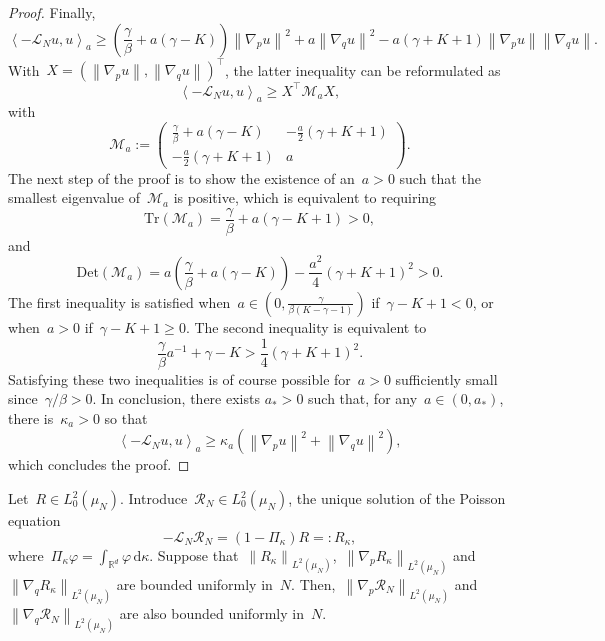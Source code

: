 \documentclass[onefignum,onetabnum]{siamart251216} %
\renewcommand{\d}{\mathrm{d}}
\newcommand{\norm}[1]{\left\lVert#1\right\rVert}
\newcommand{\real}{\mathbb R}
\newcommand{\mc}[1]{\mathcal{#1}}
\renewcommand{\geq}{\geqslant}
\newcommand{\mescin}{\mu}
\newcommand{\mesvit}{\kappa}
\newcommand{\projvit}{\Pi_{\kappa}}
\newcommand{\slangle}[1]{\left\langle #1 \right\rangle}
\theoremstyle{plain}
\numberwithin{equation}{section}
\numberwithin{theorem}{section}
\begin{document}
\begin{proof}
Finally,
\[
\slangle{-\mc{L}_N  u , u}_a \geq \left(\frac{\gamma}{\beta} + a(\gamma - K)\right)\norm{\nabla_p  u}^2 + a \norm{\nabla_q u}^2 -a(\gamma + K +1)\norm{\nabla_p u}\norm{\nabla_q u}.
\]
With~$X = (\norm{\nabla_p u},\norm{\nabla_q u})^\top$, the latter inequality can be reformulated as
\[
\slangle{-\mc{L}_N u ,u}_a \geq X^\top\mc{M}_aX,
\]
with
\[
\mc{M}_a :=\begin{pmatrix}
            \displaystyle\frac{\gamma}{\beta} + a(\gamma - K) & \displaystyle-\frac{a}{2}(\gamma + K + 1) \\
            \displaystyle-\frac{a}{2}(\gamma + K + 1) & a
            \end{pmatrix}.
\]
The next step of the proof is to show the existence of an~$a >0$ such that the smallest eigenvalue of~$\mc{M}_a$ is positive, which is equivalent to requiring
$$
\text{Tr}(\mc{M}_a) = \frac{\gamma}{\beta} + a(\gamma - K +1) >0,
$$
and
$$
\text{Det}(\mc{M}_a) = a\left(\frac{\gamma}{\beta} + a(\gamma - K)\right)-\frac{a^2}{4}(\gamma + K + 1)^2>0.
$$
The first inequality is satisfied when~$a \in \left(0,\displaystyle\frac{\gamma}{\beta(K - \gamma -1)}\right)$ if~$\gamma - K +1 <0$, or when~$a>0$ if~$\gamma - K +1 \geq 0$. 
The second inequality is equivalent to
\[
\frac{\gamma}{\beta}a^{-1}+\gamma - K > \frac14(\gamma + K + 1)^2.
\]
Satisfying these two inequalities is of course possible for~$a>0$ sufficiently small since~$\gamma/\beta >0$. In conclusion, there exists $a_*>0$ such that, for any~$a \in (0,a_*)$, there is~$\kappa_a >0$ so that
\[
\slangle{-\mc{L}_N u ,u}_a \geq \kappa_a \left(\norm{\nabla_p u}^2+\norm{\nabla_q u}^2\right),
\]
which concludes the proof.
\end{proof}
\begin{proposition}
    \label{prop:bound_inde_N}
    Let~$R \in L_0^2(\mescin_N)$. Introduce~$\mc{R}_N \in L_0^2(\mescin_N)$, the unique solution of the Poisson equation
    \[
    -\mc{L}_N \mc{R}_N = (1-\projvit)R =: R_\kappa,
    \]
    where~$\projvit\varphi = \int_{\real^d}\varphi\,\d \mesvit$. Suppose that~$\norm{R_\kappa}_{L^2(\mescin_N)}$,~$\norm{\nabla_p R_\kappa}_{L^2(\mescin_N)}$ and~$\norm{\nabla_q R_\kappa}_{L^2(\mescin_N)}$ are bounded uniformly in~$N$. Then,~$\norm{\nabla_p \mc{R}_N}_{L^2(\mescin_N)}$ and~$\norm{\nabla_q \mc{R}_N}_{L^2(\mescin_N)}$ are also bounded uniformly in~$N$.
\end{proposition}
\end{document}
